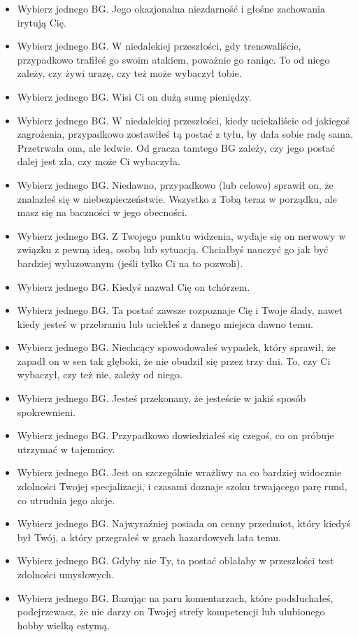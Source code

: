 \begin{itemize}
\item Wybierz jednego BG. Jego okazjonalna niezdarność i głośne zachowania irytują Cię.
\item Wybierz jednego BG. W niedalekiej przeszłości, gdy trenowaliście, przypadkowo trafiłeś go swoim atakiem, poważnie go raniąc. To od niego zależy, czy żywi urazę, czy też może wybaczył tobie.
\item Wybierz jednego BG. Wisi Ci on dużą sumę pieniędzy.
\item Wybierz jednego BG. W niedalekiej przeszłości, kiedy uciekaliście od jakiegoś zagrożenia, przypadkowo zostawiłeś tą postać z tyłu, by dała sobie radę sama. Przetrwała ona, ale ledwie. Od gracza tamtego BG zależy, czy jego postać dalej jest zła, czy może Ci wybaczyła.
\item Wybierz jednego BG. Niedawno, przypadkowo (lub celowo) sprawił on, że znalazłeś się w niebezpieczeństwie. Wszystko z Tobą teraz w porządku, ale masz się na baczności w jego obecności.
\item Wybierz jednego BG. Z Twojego punktu widzenia, wydaje się on nerwowy w związku z pewną ideą, osobą lub sytuacją. Chciałbyś nauczyć go jak być bardziej wyluzowanym (jeśli tylko Ci na to pozwoli).
\item Wybierz jednego BG. Kiedyś nazwał Cię on tchórzem.
\item Wybierz jednego BG. Ta postać zawsze rozpoznaje Cię i Twoje ślady, nawet kiedy jesteś w przebraniu lub uciekłeś z danego miejsca dawno temu.
\item Wybierz jednego BG. Niechcący spowodowałeś wypadek, który sprawił, że zapadł on w sen tak głęboki, że nie obudził się przez trzy dni. To, czy Ci wybaczył, czy też nie, zależy od niego.
\item Wybierz jednego BG. Jesteś przekonany, że jesteście w jakiś sposób spokrewnieni.
\item Wybierz jednego BG. Przypadkowo dowiedziałeś się czegoś, co on próbuje utrzymać w tajemnicy. 
\item Wybierz jednego BG. Jest on szczególnie wrażliwy na co bardziej widocznie zdolności Twojej specjalizacji, i czasami doznaje szoku trwającego parę rund, co utrudnia jego akcje. 
\item Wybierz jednego BG. Najwyraźniej posiada on cenny przedmiot, który kiedyś był Twój, a który przegrałeś w grach hazardowych lata temu.
\item Wybierz jednego BG. Gdyby nie Ty, ta postać oblałaby w przeszłości test zdolności umysłowych.
\item Wybierz jednego BG. Bazując na paru komentarzach, które podsłuchałeś, podejrzewasz, że nie darzy on Twojej strefy kompetencji lub ulubionego hobby wielką estymą. 

\end{itemize}
